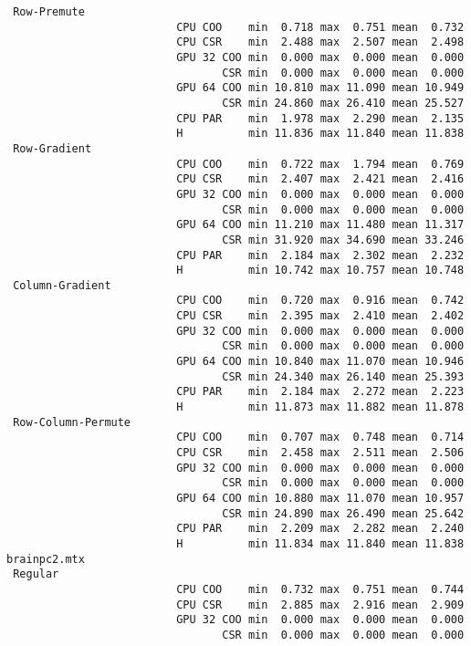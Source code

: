 \begin{verbatim}
 Row-Premute
                          CPU COO    min  0.718 max  0.751 mean  0.732
                          CPU CSR    min  2.488 max  2.507 mean  2.498
                          GPU 32 COO min  0.000 max  0.000 mean  0.000
                                 CSR min  0.000 max  0.000 mean  0.000
                          GPU 64 COO min 10.810 max 11.090 mean 10.949
                                 CSR min 24.860 max 26.410 mean 25.527
                          CPU PAR    min  1.978 max  2.290 mean  2.135
                          H          min 11.836 max 11.840 mean 11.838
 Row-Gradient
                          CPU COO    min  0.722 max  1.794 mean  0.769
                          CPU CSR    min  2.407 max  2.421 mean  2.416
                          GPU 32 COO min  0.000 max  0.000 mean  0.000
                                 CSR min  0.000 max  0.000 mean  0.000
                          GPU 64 COO min 11.210 max 11.480 mean 11.317
                                 CSR min 31.920 max 34.690 mean 33.246
                          CPU PAR    min  2.184 max  2.302 mean  2.232
                          H          min 10.742 max 10.757 mean 10.748
 Column-Gradient
                          CPU COO    min  0.720 max  0.916 mean  0.742
                          CPU CSR    min  2.395 max  2.410 mean  2.402
                          GPU 32 COO min  0.000 max  0.000 mean  0.000
                                 CSR min  0.000 max  0.000 mean  0.000
                          GPU 64 COO min 10.840 max 11.070 mean 10.946
                                 CSR min 24.340 max 26.140 mean 25.393
                          CPU PAR    min  2.184 max  2.272 mean  2.223
                          H          min 11.873 max 11.882 mean 11.878
 Row-Column-Permute
                          CPU COO    min  0.707 max  0.748 mean  0.714
                          CPU CSR    min  2.458 max  2.511 mean  2.506
                          GPU 32 COO min  0.000 max  0.000 mean  0.000
                                 CSR min  0.000 max  0.000 mean  0.000
                          GPU 64 COO min 10.880 max 11.070 mean 10.957
                                 CSR min 24.890 max 26.490 mean 25.642
                          CPU PAR    min  2.209 max  2.282 mean  2.240
                          H          min 11.834 max 11.840 mean 11.838
brainpc2.mtx
 Regular
                          CPU COO    min  0.732 max  0.751 mean  0.744
                          CPU CSR    min  2.885 max  2.916 mean  2.909
                          GPU 32 COO min  0.000 max  0.000 mean  0.000
                                 CSR min  0.000 max  0.000 mean  0.000

\end{verbatim}
